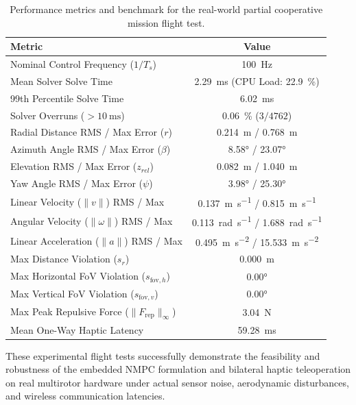 \begin{table}[htbp]
\centering
\small
\caption{Performance metrics and benchmark for the real-world partial cooperative mission flight test.}
\label{tab:hw_mission_metrics}
\begin{tabular}{lc}
\toprule
\textbf{Metric} & \textbf{Value} \\
\midrule
Nominal Control Frequency ($1/T_s$) & \SI{100}{\hertz} \\
Mean Solver Solve Time & \SI{2.29}{\milli\second} (CPU Load: \SI{22.9}{\percent}) \\
99th Percentile Solve Time & \SI{6.02}{\milli\second} \\
Solver Overruns ($> \SI{10}{\milli\second}$) & \SI{0.06}{\percent} ($3 / 4762$) \\
\midrule
Radial Distance RMS / Max Error ($r$) & \SI{0.214}{\meter} / \SI{0.768}{\meter} \\
Azimuth Angle RMS / Max Error ($\beta$) & \ang{8.58} / \ang{23.07} \\
Elevation RMS / Max Error ($z_{rel}$) & \SI{0.082}{\meter} / \SI{1.040}{\meter} \\
Yaw Angle RMS / Max Error ($\psi$) & \ang{3.98} / \ang{25.30} \\
\midrule
Linear Velocity ($\|v\|$) RMS / Max & \SI{0.137}{\meter\per\second} / \SI{0.815}{\meter\per\second} \\
Angular Velocity ($\|\omega\|$) RMS / Max & \SI{0.113}{\radian\per\second} / \SI{1.688}{\radian\per\second} \\
Linear Acceleration ($\|a\|$) RMS / Max & \SI{0.495}{\meter\per\second\squared} / \SI{15.533}{\meter\per\second\squared} \\
\midrule
Max Distance Violation ($s_r$) & \SI{0.000}{\meter} \\
Max Horizontal FoV Violation ($s_{\text{fov},h}$) & \ang{0.00} \\
Max Vertical FoV Violation ($s_{\text{fov},v}$) & \ang{0.00} \\
Max Peak Repulsive Force ($\|F_{\text{rep}}\|_{\infty}$) & \SI{3.04}{\newton} \\
Mean One-Way Haptic Latency & \SI{59.28}{\milli\second} \\
\bottomrule
\end{tabular}
\end{table}

These experimental flight tests successfully demonstrate the feasibility and robustness of the embedded NMPC formulation and bilateral haptic teleoperation on real multirotor hardware under actual sensor noise, aerodynamic disturbances, and wireless communication latencies.